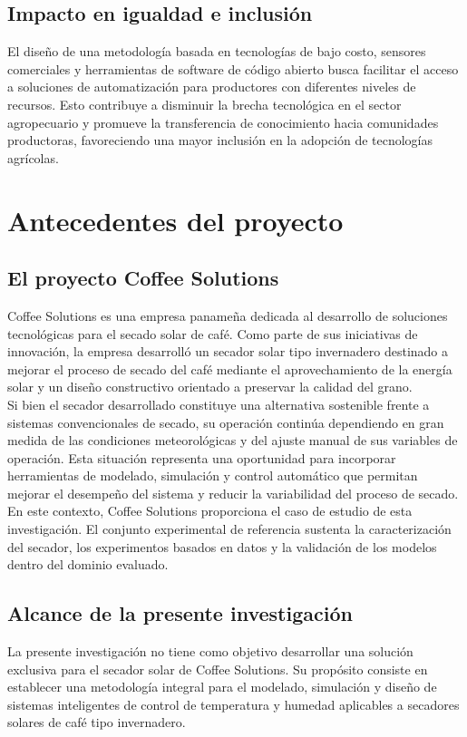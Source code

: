 \subsection{Impacto en igualdad e inclusión}
El diseño de una metodología basada en tecnologías de bajo costo, sensores comerciales y herramientas de software de código abierto busca facilitar el acceso a soluciones de automatización para productores con diferentes niveles de recursos. Esto contribuye a disminuir la brecha tecnológica en el sector agropecuario y promueve la transferencia de conocimiento hacia comunidades productoras, favoreciendo una mayor inclusión en la adopción de tecnologías agrícolas.


\section{Antecedentes del proyecto}
\subsection{El proyecto Coffee Solutions}
Coffee Solutions es una empresa panameña dedicada al desarrollo de soluciones tecnológicas para el secado solar de café. Como parte de sus iniciativas de innovación, la empresa desarrolló un secador solar tipo invernadero destinado a mejorar el proceso de secado del café mediante el aprovechamiento de la energía solar y un diseño constructivo orientado a preservar la calidad del grano.\\

Si bien el secador desarrollado constituye una alternativa sostenible frente a sistemas convencionales de secado, su operación continúa dependiendo en gran medida de las condiciones meteorológicas y del ajuste manual de sus variables de operación. Esta situación representa una oportunidad para incorporar herramientas de modelado, simulación y control automático que permitan mejorar el desempeño del sistema y reducir la variabilidad del proceso de secado.\\

En este contexto, Coffee Solutions proporciona el caso de estudio de esta investigación. El conjunto experimental de referencia sustenta la caracterización del secador, los experimentos basados en datos y la validación de los modelos dentro del dominio evaluado.\\

\subsection{Alcance de la presente investigación}
La presente investigación no tiene como objetivo desarrollar una solución exclusiva para el secador solar de Coffee Solutions. Su propósito consiste en establecer una metodología integral para el modelado, simulación y diseño de sistemas inteligentes de control de temperatura y humedad aplicables a secadores solares de café tipo invernadero.\\

